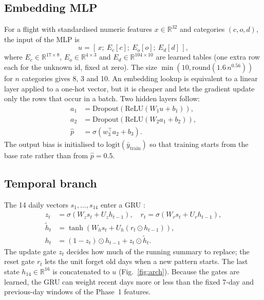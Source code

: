 \documentclass[conference]{IEEEtran}
\begin{document}
\subsection{Embedding MLP}
For a flight with standardised numeric features $x\in\mathbb{R}^{32}$ and categories
$(c,o,d)$, the input of the MLP is
\begin{equation}
u = [\,x;\ E_c[c];\ E_o[o];\ E_d[d]\,],
\end{equation}
where $E_c\in\mathbb{R}^{17\times 8}$, $E_o\in\mathbb{R}^{4\times 3}$ and
$E_d\in\mathbb{R}^{104\times 10}$ are learned tables (one extra row each for the unknown
id, fixed at zero). The size $\min(10, \mathrm{round}(1.6\,n^{0.56}))$ for $n$ categories
\cite{howard2020fastai} gives 8, 3 and 10. An embedding lookup is equivalent to a linear
layer applied to a one-hot vector, but it is cheaper and lets the gradient update only the
rows that occur in a batch. Two hidden layers follow:
\begin{align}
a_1 &= \mathrm{Dropout}(\mathrm{ReLU}(W_1 u + b_1)),\\
a_2 &= \mathrm{Dropout}(\mathrm{ReLU}(W_2 a_1 + b_2)),\\
\hat p &= \sigma(w_3^{\top} a_2 + b_3).
\end{align}
The output bias is initialised to $\mathrm{logit}(\bar y_{\text{train}})$ so that training
starts from the base rate rather than from $\hat p = 0.5$.

\subsection{Temporal branch}
The 14 daily vectors $s_1,\dots,s_{14}$ enter a GRU \cite{cho2014gru}:
\begin{align}
z_t &= \sigma(W_z s_t + U_z h_{t-1}),\quad r_t = \sigma(W_r s_t + U_r h_{t-1}),\\
\tilde h_t &= \tanh(W_h s_t + U_h(r_t \odot h_{t-1})),\\
h_t &= (1-z_t)\odot h_{t-1} + z_t \odot \tilde h_t .
\end{align}
The update gate $z_t$ decides how much of the running summary to replace; the reset gate
$r_t$ lets the unit forget old days when a new pattern starts. The last state
$h_{14}\in\mathbb{R}^{16}$ is concatenated to $u$ (Fig.~\ref{fig:arch}). Because the gates
are learned, the GRU can weight recent days more or less than the fixed 7-day and
previous-day windows of the Phase~1 features.
\end{document}
